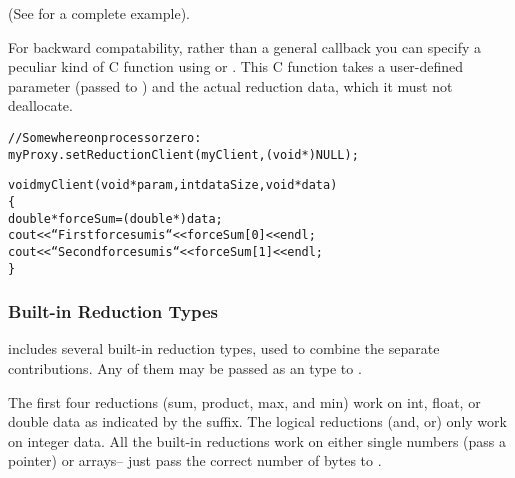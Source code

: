 (See  for a complete example).

For backward compatability, rather than a general callback you can
specify a peculiar kind of C function using 
or .  This C function takes a user-defined
parameter (passed to ) and the actual reduction data,
which it must not deallocate.

\begin{alltt}
  //Somewhere on processor zero:
  myProxy.setReductionClient(myClient,(void *)NULL);

void myClient(void *param,int dataSize,void *data)
\{
  double *forceSum=(double *)data;
  cout<<``First force sum is ``<<forceSum[0]<<endl;
  cout<<``Second force sum is ``<<forceSum[1]<<endl;
\}
\end{alltt}



\subsubsection{Built-in Reduction Types}
\label{builtin_reduction}

\charmpp{} includes several built-in reduction types, used to combine 
the separate contributions.  Any of them may be passed as an
 type to .

The first four reductions (sum, product, max, and min) work on int,
float, or double data as indicated by the suffix.  The logical
reductions (and, or) only work on integer data.  All the built-in
reductions work on either single numbers (pass a pointer) or arrays-- just
pass the correct number of bytes to .

